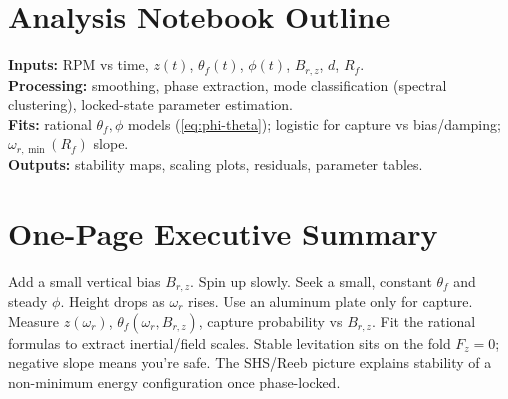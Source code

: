 \documentclass[11pt]{article}
\theoremstyle{definition}
\theoremstyle{plain}
\begin{document}
\section{Analysis Notebook Outline}
\textbf{Inputs:} RPM vs time, \(z(t)\), \(\theta_f(t)\), \(\phi(t)\), \(B_{r,z}\), \(d\), \(R_f\). \\
\textbf{Processing:} smoothing, phase extraction, mode classification (spectral clustering), locked-state parameter estimation. \\
\textbf{Fits:} rational \(\theta_f,\phi\) models (\cref{eq:phi-theta}); logistic for capture vs bias/damping; \(\omega_{r,\min}(R_f)\) slope. \\
\textbf{Outputs:} stability maps, scaling plots, residuals, parameter tables.

\section*{One-Page Executive Summary}
Add a small vertical bias \(B_{r,z}\). Spin up slowly. Seek a small, constant \(\theta_f\) and steady \(\phi\).
Height drops as \(\omega_r\) rises. Use an aluminum plate only for capture.
Measure \(z(\omega_r)\), \(\theta_f(\omega_r,B_{r,z})\), capture probability vs \(B_{r,z}\).
Fit the rational formulas to extract inertial/field scales.
Stable levitation sits on the fold \(F_z=0\); negative slope means you’re safe.
The SHS/Reeb picture explains stability of a non-minimum energy configuration once phase-locked.
\end{document}
